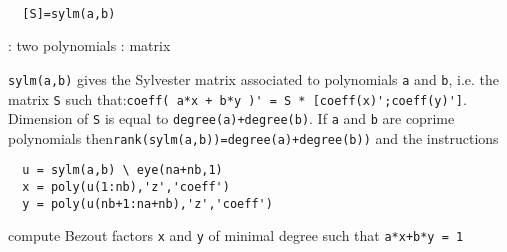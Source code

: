 
\begin{mandesc}
   \\ %
\end{mandesc}
\begin{calling_sequence}
\begin{verbatim}
  [S]=sylm(a,b)  
\end{verbatim}
\end{calling_sequence}
\begin{parameters}
  \begin{varlist}
    : two polynomials
    : matrix
  \end{varlist}
\end{parameters}
\begin{mandescription}
  \verb!sylm(a,b)! gives the Sylvester matrix associated to polynomials
  \verb!a! and \verb!b!, i.e. the matrix \verb!S! such that:\verb!coeff( a*x + b*y )' = S * [coeff(x)';coeff(y)']!.
  Dimension of \verb!S! is equal to \verb!degree(a)+degree(b)!.
  If \verb!a! and \verb!b! are coprime polynomials then\verb!rank(sylm(a,b))=degree(a)+degree(b))! and the instructions
\begin{verbatim}
  u = sylm(a,b) \ eye(na+nb,1)
  x = poly(u(1:nb),'z','coeff')
  y = poly(u(nb+1:na+nb),'z','coeff')
\end{verbatim}
compute Bezout factors \verb!x! and \verb!y! of minimal degree 
such that \verb!a*x+b*y = 1!
\end{mandescription}
